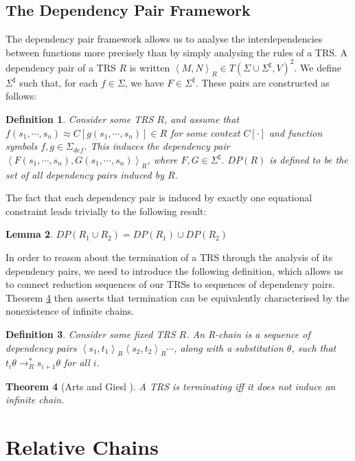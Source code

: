 \documentclass{article}
\newtheorem{theorem}{Theorem}[section]
\newtheorem{lemma}[theorem]{Lemma}
\newtheorem{definition}[theorem]{Definition}
\newcommand{\dpair}[2]{\left\langle #1, #2 \right\rangle}
\begin{document}
\subsection{The Dependency Pair Framework}

The dependency pair framework \cite{arts2000dependency} allows us to analyse the interdependencies between functions more precisely than by simply analysing the rules of a TRS. A dependency pair of a TRS $R$ is written $\dpair{M}{N}_R \in T(\Sigma \cup \Sigma^\sharp, V)^2$. We define $\Sigma^\sharp$ such that, for each $f \in \Sigma$, we have $F \in \Sigma^\sharp$. These pairs are constructed as follows:
\begin{definition}
    Consider some TRS $R$, and assume that $f(s_1, \cdots, s_n) \approx C[g(s_1, \cdots, s_n)] \in R$ for some context $C[\cdot]$ and function symbols $f, g \in \Sigma_{def}$. This induces the \emph{dependency pair} $\dpair{F (s_1, \cdots, s_n)}{G(s_1, \cdots, s_n)}_R $, where $F, G \in \Sigma^\sharp$. $DP(R)$ is defined to be the set of all dependency pairs induced by $R$.
\end{definition}
The fact that each dependency pair is induced by exactly one equational constraint leads trivially to the following result:
\begin{lemma} \label{thm:dep_pair_mod}
    $DP(R_1 \cup R_2) = DP(R_1) \cup DP(R_2)$
\end{lemma}
In order to reason about the termination of a TRS through the analysis of its dependency pairs, we need to introduce the following definition, which allows us to connect reduction sequences of our TRSs to sequences of dependency pairs. Theorem \ref{thm:no_infinite_chains} then asserts that termination can be equivalently characterised by the nonexistence of infinite chains.
\begin{definition}
    Consider some fixed TRS $R$. An \emph{R-chain} is a sequence of dependency pairs $\dpair{s_1}{t_1}_R \dpair{s_2}{t_2}_R \cdots$, along with a substitution $\theta$, such that $t_i \theta \rightarrow_R^* s_{i+1}\theta$ for all $i$.
\end{definition}
\begin{theorem}[Arts and Giesl \cite{arts2000dependency}]\label{thm:no_infinite_chains}
    A TRS is terminating iff it does not induce an infinite chain.
\end{theorem} 

\section{Relative Chains}
\end{document}
